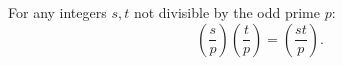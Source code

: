 For any integers $s, t$ not divisible by the odd prime $p$:
$$\left(\frac{s}{p}\right)\left(\frac{t}{p}\right) = \left(\frac{st}{p}\right).$$
